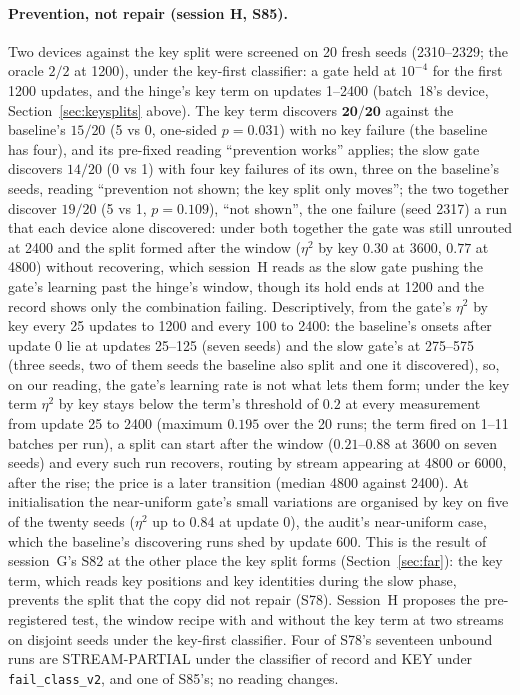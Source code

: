 \documentclass[11pt]{article}
\begin{document}
\paragraph{Prevention, not repair (session H, S85).} Two devices against the key split were screened on 20 fresh seeds (2310--2329; the oracle $2/2$ at 1200), under the key-first classifier: a gate held at $10^{-4}$ for the first 1200 updates, and the hinge's key term on updates 1--2400 (batch~18's device, Section~\ref{sec:keysplits} above). The key term discovers $\mathbf{20/20}$ against the baseline's $15/20$ (5 vs 0, one-sided $p = 0.031$) with no key failure (the baseline has four), and its pre-fixed reading ``prevention works'' applies; the slow gate discovers $14/20$ (0 vs 1) with four key failures of its own, three on the baseline's seeds, reading ``prevention not shown; the key split only moves''; the two together discover $19/20$ (5 vs 1, $p = 0.109$), ``not shown'', the one failure (seed 2317) a run that each device alone discovered: under both together the gate was still unrouted at 2400 and the split formed after the window ($\eta^2$ by key $0.30$ at 3600, $0.77$ at 4800) without recovering, which session~H reads as the slow gate pushing the gate's learning past the hinge's window, though its hold ends at 1200 and the record shows only the combination failing. Descriptively, from the gate's $\eta^2$ by key every 25 updates to 1200 and every 100 to 2400: the baseline's onsets after update 0 lie at updates 25--125 (seven seeds) and the slow gate's at 275--575 (three seeds, two of them seeds the baseline also split and one it discovered), so, on our reading, the gate's learning rate is not what lets them form; under the key term $\eta^2$ by key stays below the term's threshold of $0.2$ at every measurement from update 25 to 2400 (maximum $0.195$ over the 20 runs; the term fired on 1--11 batches per run), a split can start after the window ($0.21$--$0.88$ at 3600 on seven seeds) and every such run recovers, routing by stream appearing at 4800 or 6000, after the rise; the price is a later transition (median 4800 against 2400). At initialisation the near-uniform gate's small variations are organised by key on five of the twenty seeds ($\eta^2$ up to $0.84$ at update 0), the audit's near-uniform case, which the baseline's discovering runs shed by update 600. This is the result of session~G's S82 at the other place the key split forms (Section~\ref{sec:far}): the key term, which reads key positions and key identities during the slow phase, prevents the split that the copy did not repair (S78). Session~H proposes the pre-registered test, the window recipe with and without the key term at two streams on disjoint seeds under the key-first classifier. Four of S78's seventeen unbound runs are STREAM-PARTIAL under the classifier of record and KEY under \texttt{fail\_class\_v2}, and one of S85's; no reading changes.
\end{document}
